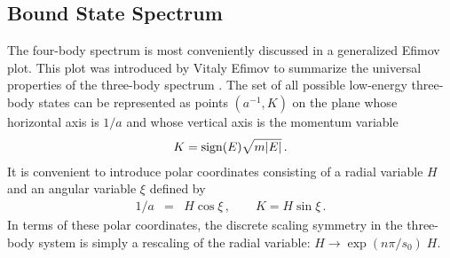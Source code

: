 \documentclass[prc,preprint,showpacs,tightenlines,%
nofootinbib]{revtex4}
\begin{document}
\subsection{Bound State Spectrum}
%
The four-body spectrum is most conveniently discussed in a
generalized Efimov plot. 
This plot was introduced by Vitaly Efimov to summarize the universal
properties of the three-body spectrum \cite{Efimov71,Braaten:2004rn}.
The set of all possible low-energy three-body states 
can be represented as points $(a^{-1}, K)$ on the plane 
whose horizontal axis is $1/a$ 
and whose vertical axis is the momentum variable
\begin{eqnarray}
K = {\rm sign} (E) \sqrt{m|E|} \,.
\label{K-def}
\end{eqnarray}
It is convenient to introduce polar coordinates consisting of
a radial variable $H$ and an angular variable $\xi$ defined by
\begin{eqnarray}
1/a &=& H \cos \xi \,,
\qquad
K   = H \sin \xi \,.
\label{Hxi-def}
\end{eqnarray}
In terms of these polar coordinates,
the discrete scaling symmetry in the three-body system
is simply a rescaling  of the radial variable: $H \to \exp(n\pi/s_0)\; H$.
\end{document}
